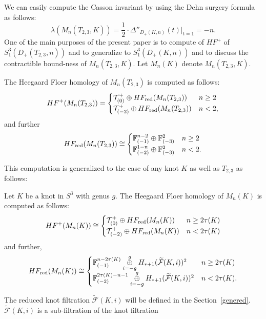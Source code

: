 \documentclass[11pt]{amsart}
\begin{document}
We can easily compute the Casson invariant by using the Dehn surgery formula as follows:
\begin{equation}
\label{casson}
\lambda(M_n(T_{2,3},K))=\frac{1}{2}\cdot\Delta''_{D_+(K,n)}(t)|_{t=1}=-n.
\end{equation}
One of the main purposes of the present paper is to compute of $HF^+$ of $S^3_1(D_+(T_{2,3},n))$
and to generalize to $S^3_1(D_+(K,n))$ and to discuss the contractible bound-ness of $M_n(T_{2,3},K)$.
Let $M_n(K)$ denote $M_n(T_{2,3},K)$.
\begin{thm}
\label{main}
The Heegaard Floer homology of $M_n(T_{2,3})$ is computed as follows:
$$HF^+(M_n(T_{2,3}))=\begin{cases}{\mathcal T}^+_{(0)}\oplus HF_{\text{\normalfont{red}}}(M_n(T_{2,3}))&n\ge 2\\{\mathcal T}^+_{(-2)}\oplus HF_{\text{\normalfont{red}}}(M_n(T_{2,3}))&n<2,\end{cases}$$
and further
$$HF_{\text{\normalfont red}}(M_n(T_{2,3}))\cong
\begin{cases}
{\Bbb F}_{(-1)}^{n-2}\oplus{\Bbb F}_{(-3)}^2&n\ge 2\\
{\Bbb F}_{(-2)}^{1-n}\oplus {\Bbb F}_{(-3)}^2&n<2.\end{cases}$$
\end{thm}
This computation is generalized to the case of any knot $K$ as well as $T_{2,3}$ as follows:
\begin{thm}
\label{genmain}
Let $K$ be a knot in $S^3$ with genus $g$.
The Heegaard Floer homology of $M_n(K)$ is computed as follows:
$$HF^+(M_n(K))\cong 
\begin{cases}
{\mathcal T}^+_{(0)}\oplus HF_{\text{\normalfont red}}(M_n(K))&n\ge 2\tau(K)\\
{\mathcal T}^+_{(-2)}\oplus HF_{\text{\normalfont red}}(M_n(K))&n<2\tau(K)
\end{cases}$$
and further,
$$HF_{\text{\normalfont red}}(M_n(K))\cong
\begin{cases}
{\Bbb F}_{(-1)}^{n-2\tau(K)}\overset{g}{\underset{i=-g}{\oplus}}H_{\ast+1}(\widetilde{\mathcal F}(K,i))^2&n\ge 2\tau(K)\\
{\Bbb F}_{(-2)}^{2\tau(K)-n-1}\overset{g}{\underset{i=-g}{\oplus}}H_{\ast+1}(\widetilde{\mathcal F}(K,i))^2&n< 2\tau(K).
\end{cases}$$
\end{thm}
The reduced knot filtration $\widetilde{{\mathcal F}}(K,i)$ will be defined in the Section~\ref{genered}.
$\widetilde{\mathcal F}(K,i)$ is a sub-filtration of the knot filtration
\end{document}
